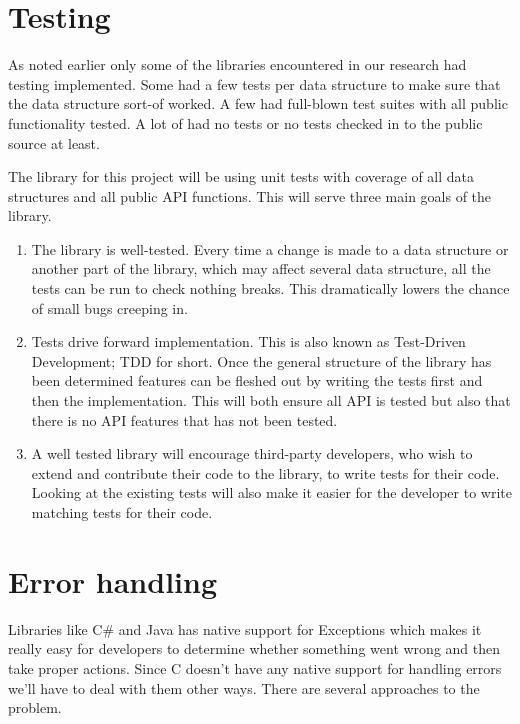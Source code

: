 \documentclass[table]{ituthesis}
\begin{document}
\section{Testing}\label{sec:arch_testing}

As noted earlier only some of the libraries encountered in our research had testing implemented. Some had a few tests per data structure to make sure that the data structure sort-of worked. A few had full-blown test suites with all public functionality tested. A lot of had no tests or no tests checked in to the public source at least.

The library for this project will be using unit tests with coverage of all data structures and all public API functions. This will serve three main goals of the library.

\begin{enumerate}
\item The library is well-tested. Every time a change is made to a data structure or another part of the library, which may affect several data structure, all the tests can be run to check nothing breaks. This dramatically lowers the chance of small bugs creeping in.
\item Tests drive forward implementation. This is also known as Test-Driven Development; TDD for short. Once the general structure of the library has been determined features can be fleshed out by writing the tests first and then the implementation. This will both ensure all API is tested but also that there is no API features that has not been tested.
\item A well tested library will encourage third-party developers, who wish to extend and contribute their code to the library, to write tests for their code. Looking at the existing tests will also make it easier for the developer to write matching tests for their code.
\end{enumerate}

\section{Error handling}\label{sec:arch_error_handling}

Libraries like C\# and Java has native support for Exceptions which makes it really easy for developers to determine whether something went wrong and then take proper actions. Since C doesn't have any native support for handling errors we'll have to deal with them other ways. There are several approaches to the problem.
\end{document}
